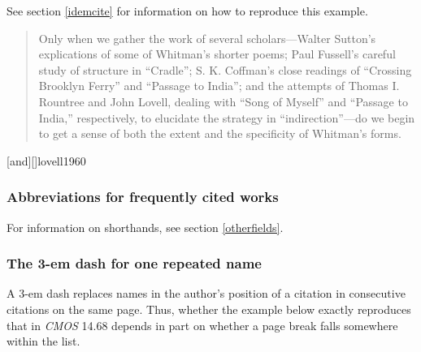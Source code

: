 \documentclass[11pt,letterpaper,oneside]{article}
\begin{document}
See section \ref{idemcite} for information on how to reproduce this
example.

\begin{quote} Only when we gather the work of several
scholars---Walter Sutton's explications of some of Whitman's shorter
poems; Paul Fussell's careful study of structure in ``Cradle''; S. K.
Coffman's close readings of ``Crossing Brooklyn Ferry'' and ``Passage
to India''; and the attempts of Thomas I. Rountree and John Lovell,
dealing with ``Song of Myself'' and ``Passage to India,''
respectively, to elucidate the strategy in ``indirection''---do we
begin to get a sense of both the extent and the specificity of
Whitman's forms.\footnotemark[1] \end{quote}

\begin{citeonly}
\item {}[and][]{lovell1960}
\end{citeonly}

\setcounter{subsubsection}{58}
\subsubsection{Abbreviations for frequently cited works}
\label{14.59}

For information on shorthands, see section \ref{otherfields}.

\begin{citebib}
\item \cite[1:126]{shurtleff1853}
\item \cite[2:330]{shurtleff1853}
\end{citebib}

\setcounter{subsubsection}{67}
\subsubsection{The 3-em dash for one repeated name}

A 3-em dash replaces names in the author's position of a citation in
consecutive citations on the same page. Thus, whether the example
below exactly reproduces that in \textit{CMOS} 14.68 depends in part
on whether a page break falls somewhere within the list.
\end{document}
